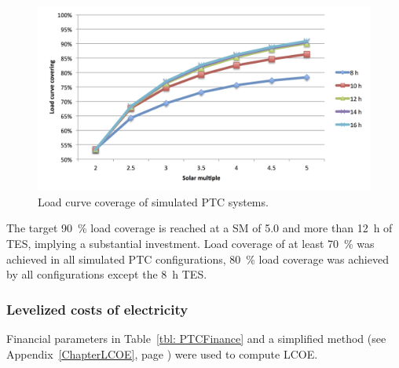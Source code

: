 \begin{figure}[bhtp]  
\centering
\includegraphics[width=1\linewidth]{FIG/PTC_LCCF}
\caption[Load curve coverage of simulated PTC systems.]{Load curve coverage of simulated PTC systems.}\label{PTC_LCCF}
\end{figure}


The target \SI{90}{\percent} load coverage is reached at a SM of \num{5.0} and more than \SI{12}{h} of TES, implying a substantial investment. Load coverage of at least \SI{70}{\percent} was achieved in all simulated PTC configurations,  \SI{80}{\percent} load coverage was achieved by all configurations except the \SI{8}{h} TES.

\subsubsection{Levelized costs of electricity}

Financial parameters in Table~\ref{tbl: PTCFinance} and a simplified method (see Appendix~\ref{ChapterLCOE}, page \pageref{ChapterLCOE}) were used to compute LCOE. 

